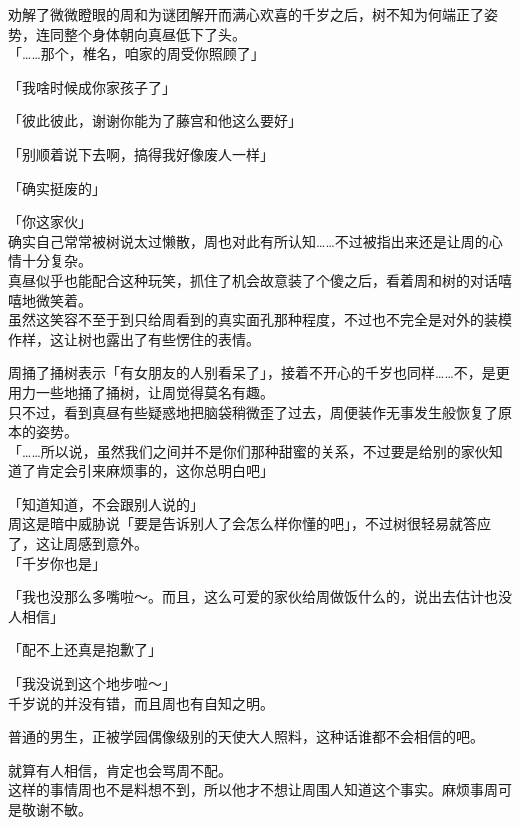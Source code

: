 劝解了微微瞪眼的周和为谜团解开而满心欢喜的千岁之后，树不知为何端正了姿势，连同整个身体朝向真昼低下了头。\\

「……那个，椎名，咱家的周受你照顾了」

「我啥时候成你家孩子了」

「彼此彼此，谢谢你能为了藤宫和他这么要好」

「别顺着说下去啊，搞得我好像废人一样」

「确实挺废的」

「你这家伙」\\

确实自己常常被树说太过懒散，周也对此有所认知……不过被指出来还是让周的心情十分复杂。\\

真昼似乎也能配合这种玩笑，抓住了机会故意装了个傻之后，看着周和树的对话嘻嘻地微笑着。\\

虽然这笑容不至于到只给周看到的真实面孔那种程度，不过也不完全是对外的装模作样，这让树也露出了有些愣住的表情。

周捅了捅树表示「有女朋友的人别看呆了」，接着不开心的千岁也同样……不，是更用力一些地捅了捅树，让周觉得莫名有趣。\\

只不过，看到真昼有些疑惑地把脑袋稍微歪了过去，周便装作无事发生般恢复了原本的姿势。\\

「……所以说，虽然我们之间并不是你们那种甜蜜的关系，不过要是给别的家伙知道了肯定会引来麻烦事的，这你总明白吧」

「知道知道，不会跟别人说的」\\

周这是暗中威胁说「要是告诉别人了会怎么样你懂的吧」，不过树很轻易就答应了，这让周感到意外。\\

「千岁你也是」

「我也没那么多嘴啦～。而且，这么可爱的家伙给周做饭什么的，说出去估计也没人相信」

「配不上还真是抱歉了」

「我没说到这个地步啦～」\\

千岁说的并没有错，而且周也有自知之明。

普通的男生，正被学园偶像级别的天使大人照料，这种话谁都不会相信的吧。

就算有人相信，肯定也会骂周不配。\\

这样的事情周也不是料想不到，所以他才不想让周围人知道这个事实。麻烦事周可是敬谢不敏。\\

